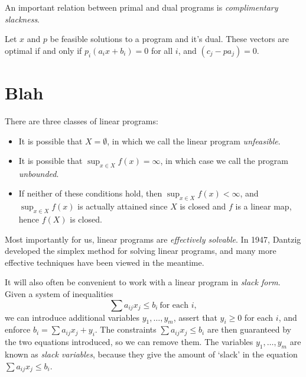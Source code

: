 An important relation between primal and dual programs is \emph{complimentary slackness}.

\begin{theorem}
    Let $x$ and $p$ be feasible solutions to a program and it's dual. These vectors are optimal if and only if $p_i(a_ix + b_i) = 0$ for all $i$, and $(c_j - pa_j) = 0$.
\end{theorem}





\chapter{Blah}

    There are three classes of linear programs:
    \begin{itemize}
        \item It is possible that $X = \emptyset$, in which we call the linear program \emph{unfeasible}.

        \item It is possible that $\sup_{x \in X} f(x) = \infty$, in which case we call the program \emph{unbounded}.

        \item If neither of these conditions hold, then $\sup_{x \in X} f(x) < \infty$, and $\sup_{x \in X} f(x)$ is actually attained since $X$ is closed and $f$ is a linear map, hence $f(X)$ is closed.
    \end{itemize}
    Most importantly for us, linear programs are \emph{effectively solvable}. In 1947, Dantzig developed the simplex method for solving linear programs, and many more effective techniques have been viewed in the meantime.

    It will also often be convenient to work with a linear program in \emph{slack form}. Given a system of inequalities
    \[ \sum a_{ij} x_j \leq b_i\ \text{for each $i$}, \]
    we can introduce additional variables $y_1, \dots, y_m$, assert that $y_i \geq 0$ for each $i$, and enforce $b_i = \sum a_{ij} x_j + y_i$. The constraints $\sum a_{ij} x_j \leq b_i$ are then guaranteed by the two equations introduced, so we can remove them. The variables $y_1, \dots, y_m$ are known as \emph{slack variables}, because they give the amount of `slack' in the equation $\sum a_{ij} x_j \leq b_i$.



